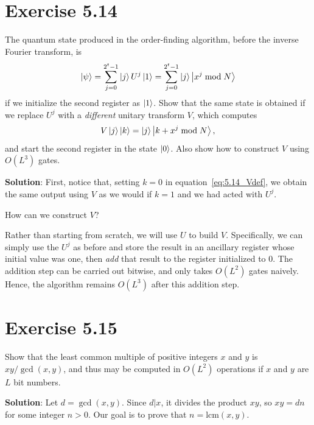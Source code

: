 \documentclass{book}
\begin{document}
\section*{Exercise 5.14}
    The quantum state produced in the order-finding algorithm, before
    the inverse Fourier transform, is
    \begin{align}
        \ket{\psi} =\sum_{j=0}^{2^t-1}\ket{j}U^j\ket{1} =\sum_{j=0}^{2^t-1}\ket{j}\ket{x^j\bmod N}
    \end{align}
    if we initialize the second register as $\ket{1}$. Show that the same state is obtained if we replace $U^j$ with a \emph{different} unitary transform $V$, which computes
    \begin{align} \label{eq:5.14_Vdef}
        V\ket{j}\ket{k} = \ket{j}\ket{k+x^j\bmod N},
    \end{align}
    and start the second register in the state $\ket{0}$. Also show how to construct $V$ using $O(L^3)$ gates.

    \textbf{Solution}: First, notice that, setting $k=0$ in equation~\eqref{eq:5.14_Vdef}, we obtain the same output using $V$ as we would if $k=1$ and we had acted with $U^j$. 
    
    How can we construct $V$? 
    
    Rather than starting from scratch, we will use $U$ to build $V$. Specifically, we can simply use the $U^j$ as before and store the result in an ancillary register whose initial value was one, then \emph{add} that result to the register initialized to 0. The addition step can be carried out bitwise, and only takes $O(L^2)$ gates naively. Hence, the algorithm remains $O(L^3)$ after this addition step.

\section*{Exercise 5.15}
    Show that the least common multiple of positive integers $x$ and $y$ is $xy/\gcd(x,y)$, and thus may be computed in $O(L^2)$ operations if $x$ and $y$ are $L$ bit numbers.
    
    \textbf{Solution}: Let $d = \gcd(x,y)$. Since $d|x$, it divides the product $xy$, so $xy = dn$ for some integer $n >0$. Our goal is to prove that $n=\text{lcm}(x,y)$.
    
\end{document}
